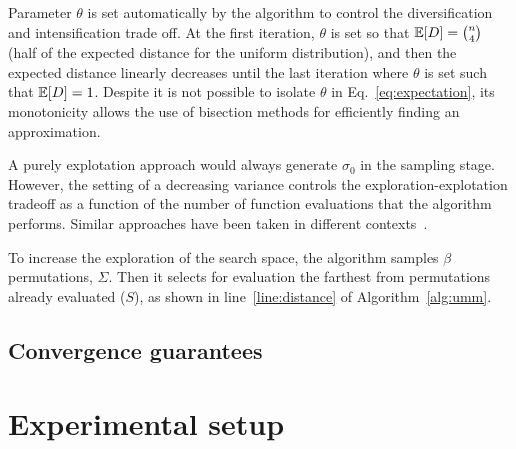 \documentclass[sigconf,dvipsnames]{acmart}
\DeclareMathOperator*{\argmax}{arg\,max}
\begin{document}
Parameter $\theta$ is set automatically by the algorithm to control the diversification and intensification trade off. At the first iteration, $\theta$ is set so that  $\mathbb{E}[D] = \binom{n}{4}$ (half of the expected distance for the uniform distribution), and then the expected distance linearly decreases until the last iteration where $\theta$ is set such that $\mathbb{E}[D] = 1$. Despite it is not possible to isolate $\theta$ in Eq.~\eqref{eq:expectation}, its monotonicity allows the use of bisection methods for efficiently finding an approximation. 

A purely explotation approach would always generate $\sigma_0$ in the sampling stage. However, the setting of a decreasing variance   controls the exploration-explotation tradeoff as a function of the number of function evaluations that the algorithm performs.  Similar approaches have been taken in different contexts~\cite{ArzCebPer2019qap}.

To increase the exploration of the search space, the algorithm samples $\beta$ permutations, $\Sigma$. Then it selects  for evaluation the farthest from permutations already evaluated ($S$), as shown in line~\ref{line:distance} of Algorithm~\ref{alg:umm}.


\subsection{Convergence guarantees}

\renewcommand{\subsubsection}[1]{\smallskip{}\noindent\textbf{#1}.}


\section{Experimental setup}\label{sec:setup}
\end{document}
